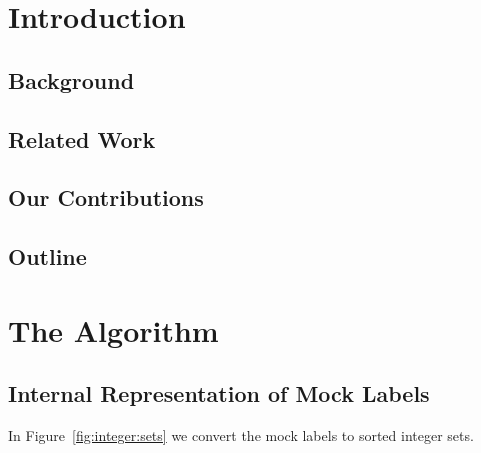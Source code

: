 \documentclass[sigconf]{acmart}
\begin{document}
\let\thefootnote\relax{}


\section{Introduction}


\subsection{Background}



\subsection{Related Work}



\subsection{Our Contributions}

\subsection{Outline}



\section{The Algorithm}

\subsection{Internal Representation of Mock Labels}
\label{sub:sec:internal}

In Figure~\ref{fig:integer:sets} we convert the mock labels to sorted integer sets.
\end{document}
